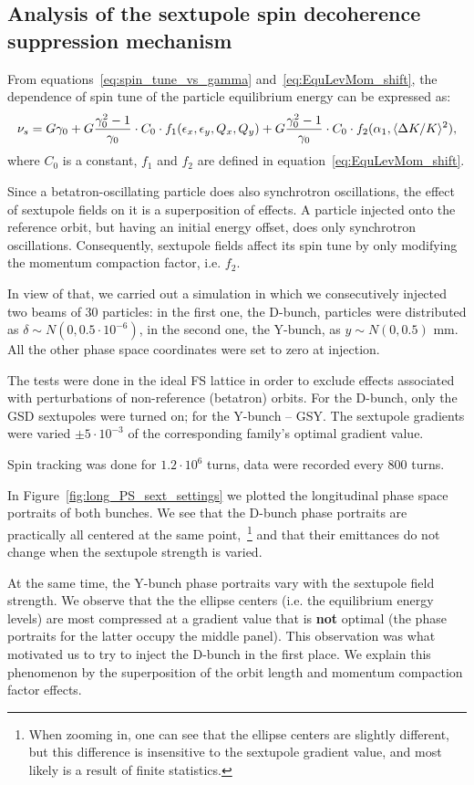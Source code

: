 \subsection{Analysis of the sextupole spin decoherence suppression mechanism}\label{sec:sext_decoh_suppression_effect_analysis}
From equations~\eqref{eq:spin_tune_vs_gamma} and~\eqref{eq:EquLevMom_shift}, the dependence of spin tune of the
particle equilibrium energy can be expressed as:
\[
\nu_s = G\gamma_0 + G\frac{\gamma_0^2-1}{\gamma_0}\cdot C_0\cdot f_1(\epsilon_x, \epsilon_y, Q_x, Q_y)+ G\frac{\gamma_0^2-1}{\gamma_0}\cdot C_0\cdot f_2(\alpha_1, \avg{\Delta K/K}^2),
\]
where $C_0$ is a constant, $f_1$ and $f_2$ are defined in equation~\eqref{eq:EquLevMom_shift}.

Since a betatron-oscillating particle does also synchrotron oscillations, the effect of sextupole fields on it
is a superposition of effects. A particle injected onto the reference orbit, but having an initial energy
offset, does only synchrotron oscillations. Consequently, sextupole fields affect its spin tune by only
modifying the momentum compaction factor, i.e. $f_2$.

In view of that, we carried out a simulation in which we consecutively injected two beams of 30 particles:
in the first one, the D-bunch, particles were distributed as $\delta\sim N(0, 0.5\cdot 10^{-6})$, 
in the second one, the Y-bunch, as $y\sim N(0, 0.5)$ mm. All the other phase space coordinates were 
set to zero at injection.

The tests were done in the ideal FS lattice in order to exclude effects associated with perturbations
of non-reference (betatron) orbits. For the D-bunch, only the GSD sextupoles were turned on; 
for the Y-bunch -- GSY. The sextupole gradients were varied $\pm 5\cdot 10^{-3}$ 
of the corresponding family's optimal gradient value.

Spin tracking was done for $1.2\cdot 10^6$ turns, data were recorded every 800 turns.

In Figure~\ref{fig:long_PS_sext_settings} we plotted the longitudinal phase space portraits of both bunches. 
We see that the D-bunch phase portraits are practically all centered at the same point,~\footnote{When zooming 	in, one can see that the ellipse centers are slightly different, but this difference is insensitive to
	the sextupole gradient value, and most likely is a result of finite statistics.} and that their 
emittances do not change when the sextupole strength is varied.

At the same time, the Y-bunch phase portraits vary with the sextupole field strength. We observe that the 
the ellipse centers (i.e. the equilibrium energy levels) are most compressed at a gradient value that is
\textbf{not} optimal (the phase portraits for the latter occupy the middle panel). This observation
was what motivated us to try to inject the D-bunch in the first place. We explain this phenomenon by the
superposition of the orbit length and momentum compaction factor effects.

